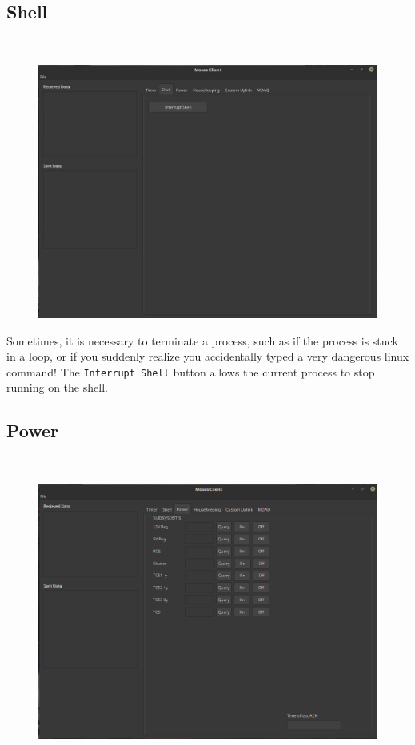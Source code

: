 \documentclass[11pt,titlepage]{article}
\begin{document}
	\newpage
	\subsection{Shell}
	\hrulefill
	\\
	
	\begin{figure}[h]
		\includegraphics[width=\textwidth]{EGSE_client_shell}
	\end{figure}

	Sometimes, it is necessary to terminate a process, such as if the process is stuck in a loop, or if you suddenly realize you accidentally typed a very dangerous linux command! The \texttt{Interrupt Shell} button allows the current process to stop running on the shell. 

	\newpage
	\subsection{Power}
	\hrulefill
	\\
	
		\begin{figure}[h]
		\includegraphics[width=\textwidth]{EGSE_client_power}
		\end{figure}
	
\end{document}
